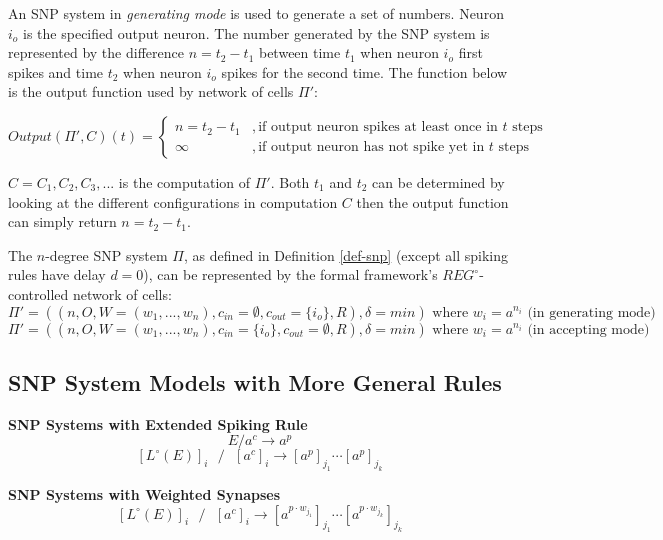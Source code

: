 \documentclass[a4paper]{article}
\theoremstyle{definition}
\newcommand{\ra}{\rightarrow}
\newcommand{\ts}{\text{ }}
\begin{document}
An SNP system in \emph{generating mode} is used to generate a set of numbers. Neuron $i_o$ is the
specified output neuron. The number generated by the SNP system is represented by the difference
$n = t_2 - t_1$ between time $t_1$ when neuron $i_o$ first spikes and time $t_2$ when neuron $i_o$
spikes for the second time. The function below is the output function used by network of cells 
$\Pi'$:

\[
Output(\Pi',C)(t) = 
\begin{cases}
n = t_2 - t_1 &, \text{if output neuron spikes at least once in $t$ steps}\\
\infty        &, \text{if output neuron has not spike yet in $t$ steps} 
\end{cases}
\]

$C = C_1, C_2,C_3,...$ is the computation of $\Pi'$. Both $t_1$ and $t_2$ can be determined by 
looking at the different configurations in computation $C$ then the output function can simply 
return $n = t_2 -t_1$. 

The $n$-degree SNP system $\Pi$, as defined in Definition \ref{def-snp} (except all spiking rules 
have delay $d=0$), can be represented by the formal framework's $REG^{\circ}$-controlled network of 
cells:
$$\Pi'= ((n,O,W=(w_1,...,w_n),c_{in}=\emptyset, c_{out}=\{i_o\}, R),\delta=min) 
\text{ where } w_i = a^{n_i} \text{ (in generating mode)}$$ 
$$\Pi'= ((n,O,W=(w_1,...,w_n), c_{in}=\{i_o\}, c_{out}=\emptyset, R),\delta=min) 
\text{ where } w_i = a^{n_i} \text{ (in accepting mode)}$$ 




\subsection{SNP System Models with More General Rules}

\noindent \textbf{SNP Systems with  Extended Spiking Rule} \cite{chen-2008-snp-e}
$$E/a^c \ra a^p$$
$${[L^{\circ}(E)]}_i\ts/\ts {[a^c]}_i \ra {[a^p]}_{j_1} \cdots {[a^p]}_{j_k}$$

\noindent \textbf{SNP Systems with Weighted Synapses} \cite{pan-2012-weighted-synapses}
$${[L^{\circ}(E)]}_i\ts/\ts {[a^c]}_i \ra {[a^{p \cdot w_{j_1}}]}_{j_1} \cdots {[a^{p\cdot w_{j_k}}]}_{j_k}$$
\end{document}
